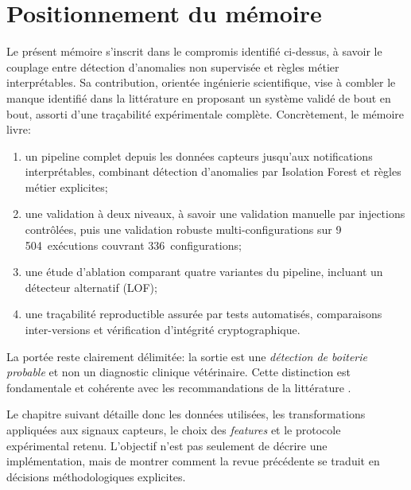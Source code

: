 \section{Positionnement du mémoire}

Le présent mémoire s'inscrit dans le compromis identifié ci-dessus, à savoir le couplage
entre détection d'anomalies non supervisée et règles métier interprétables. Sa contribution,
orientée ingénierie scientifique, vise à combler le manque identifié dans la littérature en
proposant un système validé de bout en bout, assorti d'une traçabilité expérimentale
complète. Concrètement, le mémoire livre:
\begin{enumerate}
  \item un pipeline complet depuis les données capteurs jusqu'aux notifications
  interprétables, combinant détection d'anomalies par Isolation Forest et règles métier
  explicites;
  \item une validation à deux niveaux, à savoir une validation manuelle par injections
  contrôlées, puis une validation robuste multi-configurations sur 9\,504~exécutions couvrant
  336~configurations;
  \item une étude d'ablation comparant quatre variantes du pipeline, incluant un détecteur
  alternatif (LOF);
  \item une traçabilité reproductible assurée par tests automatisés, comparaisons
  inter-versions et vérification d'intégrité cryptographique.
\end{enumerate}

La portée reste clairement délimitée: la sortie est une \textit{détection de boiterie
probable} et non un diagnostic clinique vétérinaire. Cette distinction est fondamentale et
cohérente avec les recommandations de la littérature \citep{alsaaod2019automatic}.

Le chapitre suivant détaille donc les données utilisées, les transformations appliquées aux
signaux capteurs, le choix des \textit{features} et le protocole expérimental retenu. L'objectif n'est
pas seulement de décrire une implémentation, mais de montrer comment la revue précédente se
traduit en décisions méthodologiques explicites.
